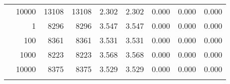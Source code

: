 \begin{table}
\begin{tabular}{rrrrrrrrr}
	            
					 &  
					 
					\multirow{ 1 }{*}{ 10000 } &
					
						
							    
							     13108  & 13108  
	                           & 2.302 & 2.302 & 0.000
	                           & 0.000 & 0.000  \\
	                
	            
	        
				\noalign{\smallskip}\hline
				\multirow{ 4 }{*}{ 500000 } &
				
					
					 
					\multirow{ 1 }{*}{ 1 } &
					
						
							    
							     8296  & 8296  
	                           & 3.547 & 3.547 & 0.000
	                           & 0.000 & 0.000  \\
	                
	            
					 &  
					 
					\multirow{ 1 }{*}{ 100 } &
					
						
							    
							     8361  & 8361  
	                           & 3.531 & 3.531 & 0.000
	                           & 0.000 & 0.000  \\
	                
	            
					 &  
					 
					\multirow{ 1 }{*}{ 1000 } &
					
						
							    
							     8223  & 8223  
	                           & 3.568 & 3.568 & 0.000
	                           & 0.000 & 0.000  \\
	                
	            
					 &  
					 
					\multirow{ 1 }{*}{ 10000 } &
					
						
							    
							     8375  & 8375  
	                           & 3.529 & 3.529 & 0.000
	                           & 0.000 & 0.000  \\
	                
	            
	        
				\noalign{\smallskip}\hline
				\multirow{ 4 }{*}{ 1000000 } &
				
					
					 

\end{tabular}
\end{table}
